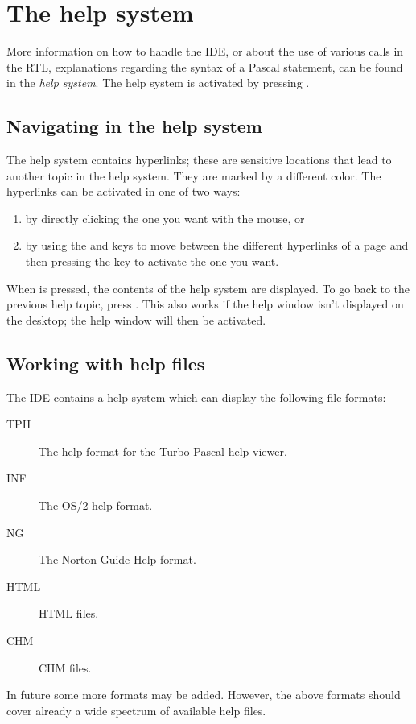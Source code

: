 \section{The help system}

More information on how to handle the IDE, or about the use of various
calls in the RTL, explanations regarding the syntax of a Pascal statement,
can be found in the \emph{help system}. The help system is activated
by pressing .

\subsection{Navigating in the help system}
The help system contains hyperlinks; these are sensitive locations that
lead to another topic in the help system. They are marked by a different
color. The hyperlinks can be activated in one of two ways:
\begin{enumerate}
\item by directly clicking the one you want with the mouse, or
\item by using the  and  keys to move between
the different hyperlinks of a page and then pressing the  
key to activate the one you want.
\end{enumerate}

When  is pressed, the contents of the help system are
displayed. To go back to the previous help topic, press .
This also works if the help window isn't displayed on the desktop; the help
window will then be activated.

%
%
\subsection{Working with help files}
The IDE contains a help system which can display the following file formats:
\begin{description}
\item[TPH] The help format for the Turbo Pascal help viewer.
\item[INF] The OS/2 help format.
\item[NG] The Norton Guide Help format.
\item[HTML] HTML files.
\item[CHM] CHM files.
\end{description}
In future some more formats may be added. However, the above formats should
cover already a wide spectrum of available help files.

